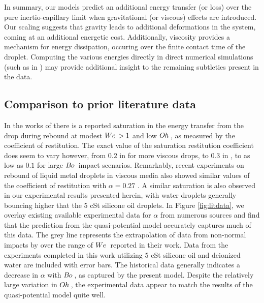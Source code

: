 \documentclass{jfm}
\begin{document}
In summary, our models predict an additional energy transfer (or loss) over the pure inertio-capillary limit when gravitational (or viscous) effects are introduced.  Our scaling suggests that gravity leads to additional deformations in the system, coming at an additional energetic cost.  Additionally, viscosity provides a mechanism for energy dissipation, occuring over the finite contact time of the droplet.  Computing the various energies directly in direct numerical simulations (such as in \cite{sanjay2022drop}) may provide additional insight to the remaining subtleties present in the data. 

\subsection{Comparison to prior literature data}

\hspace*{1em} In the works of \cite{jayaratne1964coalescence,bach2004coalescence,zhao2011transition,zou2011experimental,molavcek2013drops} there is a reported saturation in the energy transfer from the drop during rebound at modest $W\kern-0.03em e\, > 1$ and low $O\kern-0.04em h\,$, as measured by the coefficient of restitution.  The exact value of the saturation restitution coefficient does seem to vary however, from $0.2$ in \cite{molavcek2012quasi} for more viscous drops, to $0.3$ in \cite{bach2004coalescence,zhao2011transition}, to as low as $0.1$ \citep{zou2011experimental} for large $B\kern-0.04em o\,$ impact scenarios.  Remarkably, recent experiments on rebound of liquid metal droplets in viscous media also showed similar values of the coefficient of restitution with $\alpha=0.27$ \citep{mcguan2022dynamics}.  A similar saturation is also observed in our experimental results presented herein, with water droplets generally bouncing higher that the 5 cSt silicone oil droplets.  In Figure \ref{fig:litdata}, we overlay existing available experimental data for $\alpha$ from numerous sources and find that the prediction from the quasi-potential model
accurately captures much of this data.  The grey line represents the extrapolation of data from non-normal impacts by \citep{jayaratne1964coalescence} over the range of $W\kern-0.03em e\,$ reported in their work.  Data from the experiments completed in this work utilizing $5$ cSt silicone oil and deionized water are included with error bars.  The historical data generally indicates a decrease in $\alpha$ with $B\kern-0.04em o\,$, as captured by the present model.  Despite the relatively large variation in $O\kern-0.04em h\,$, the experimental data appear to match the results of the quasi-potential model quite well.
\end{document}
